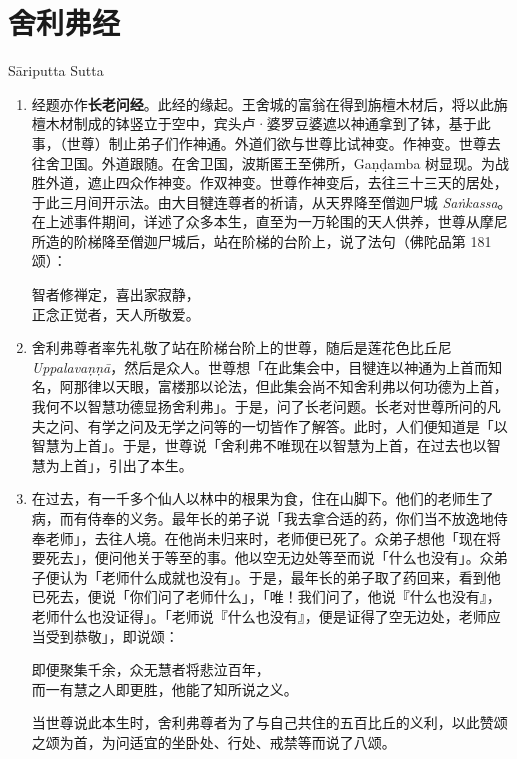 \section{舍利弗经}

\begin{center}Sāriputta Sutta\end{center}\vspace{1em}

\begin{enumerate}\item 经题亦作\textbf{长老问经}。此经的缘起。王舍城的富翁在得到旃檀木材后，将以此旃檀木材制成的钵竖立于空中，宾头卢·婆罗豆婆遮以神通拿到了钵，基于此事，（世尊）制止弟子们作神通。外道们欲与世尊比试神变。作神变。世尊去往舍卫国。外道跟随。在舍卫国，波斯匿王至佛所，Gaṇḍamba 树显现。为战胜外道，遮止四众作神变。作双神变。世尊作神变后，去往三十三天的居处，于此三月间开示法。由大目犍连尊者的祈请，从天界降至僧迦尸城 \textit{Saṅkassa}。在上述事件期间，详述了众多本生，直至为一万轮围的天人供养，世尊从摩尼所造的阶梯降至僧迦尸城后，站在阶梯的台阶上，说了法句（佛陀品第 181 颂）：\begin{quoting}智者修禅定，喜出家寂静，\\正念正觉者，天人所敬爱。\end{quoting}
\item 舍利弗尊者率先礼敬了站在阶梯台阶上的世尊，随后是莲花色比丘尼 \textit{Uppalavaṇṇā}，然后是众人。世尊想「在此集会中，目犍连以神通为上首而知名，阿那律以天眼，富楼那以论法，但此集会尚不知舍利弗以何功德为上首，我何不以智慧功德显扬舍利弗」。于是，问了长老问题。长老对世尊所问的凡夫之问、有学之问及无学之问等的一切皆作了解答。此时，人们便知道是「以智慧为上首」。于是，世尊说「舍利弗不唯现在以智慧为上首，在过去也以智慧为上首」，引出了本生。
\item 在过去，有一千多个仙人以林中的根果为食，住在山脚下。他们的老师生了病，而有侍奉的义务。最年长的弟子说「我去拿合适的药，你们当不放逸地侍奉老师」，去往人境。在他尚未归来时，老师便已死了。众弟子想他「现在将要死去」，便问他关于等至的事。他以空无边处等至而说「什么也没有」。众弟子便认为「老师什么成就也没有」。于是，最年长的弟子取了药回来，看到他已死去，便说「你们问了老师什么」，「唯！我们问了，他说『什么也没有』，老师什么也没证得」。「老师说『什么也没有』，便是证得了空无边处，老师应当受到恭敬」，即说颂：\begin{quoting}即便聚集千余，众无慧者将悲泣百年，\\而一有慧之人即更胜，他能了知所说之义。\end{quoting}当世尊说此本生时，舍利弗尊者为了与自己共住的五百比丘的义利，以此赞颂之颂为首，为问适宜的坐卧处、行处、戒禁等而说了八颂。\end{enumerate}

